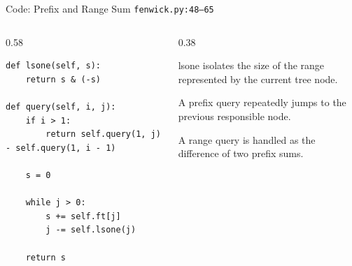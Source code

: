 \documentclass[aspectratio=169,11pt]{beamer}
\begin{document}
\begin{frame}[fragile]{Code: Prefix and Range Sum}
\scriptsize
{} \texttt{fenwick.py:48--65}

\vspace{0.08cm}
\begin{columns}[T,totalwidth=\textwidth]
\begin{column}{0.58\textwidth}
\begin{lstlisting}[style=cpcode]
def lsone(self, s):
    return s & (-s)

def query(self, i, j):
    if i > 1:
        return self.query(1, j) - self.query(1, i - 1)

    s = 0

    while j > 0:
        s += self.ft[j]
        j -= self.lsone(j)

    return s
\end{lstlisting}
\end{column}
\begin{column}{0.38\textwidth}
\begin{tightitemize}
  \item lsone isolates the size of the range represented by the current tree node.
  \item A prefix query repeatedly jumps to the previous responsible node.
  \item A range query is handled as the difference of two prefix sums.
\end{tightitemize}
\end{column}
\end{columns}
\end{frame}
\end{document}
